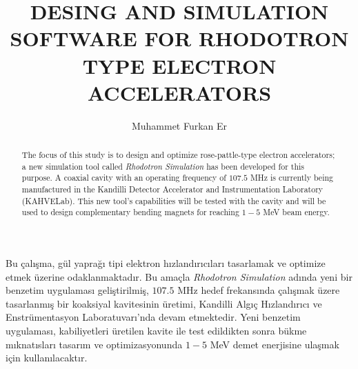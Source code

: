 \documentclass[a4paper,oneside,12pt]{report}
\title{DESING AND SIMULATION SOFTWARE FOR RHODOTRON TYPE ELECTRON ACCELERATORS}
\author{Muhammet Furkan Er}
\numberwithin{equation}{chapter}
\begin{document}
\makemstitle %
\makeapprovalpage


\begin{abstract}
    The focus of this study is to design and optimize rose-pattle-type electron accelerators; a new simulation tool called \textit{Rhodotron Simulation} has been developed for this purpose.
    A coaxial cavity with an operating frequency of $107.5$ MHz is currently being manufactured in the Kandilli Detector Accelerator and Instrumentation Laboratory (KAHVELab).
    This new tool's capabilities will be tested with the cavity and will be used to design complementary bending magnets for reaching $1-5$ MeV beam energy.
\end{abstract}

\begin{ozet}
Bu çalışma, gül yaprağı tipi elektron hızlandırıcıları tasarlamak ve optimize etmek üzerine odaklanmaktadır. 
Bu amaçla \textit{Rhodotron Simulation} adında yeni bir benzetim uygulaması geliştirilmiş, $107.5$ MHz hedef frekansında çalışmak üzere tasarlanmış bir koaksiyal kavitesinin üretimi, Kandilli Algıç Hızlandırıcı ve Enstrümentasyon Laboratuvarı'nda devam etmektedir.
Yeni benzetim uygulaması, kabiliyetleri üretilen kavite ile test edildikten sonra bükme mıknatısları tasarım ve optimizasyonunda $1-5$ MeV demet enerjisine ulaşmak için kullanılacaktır.
\end{ozet}

\tableofcontents
\listoffigures 
\listoftables

\begin{symbols}
    \sym{}{}

    \sym{}{}
\end{symbols}
\end{document}
